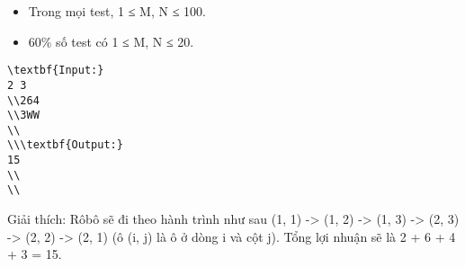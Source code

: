 \begin{itemize}
	\item     Trong mọi test, 1 ≤ M, N ≤ 100.   
	\item     60\% số test có 1 ≤ M, N ≤ 20.   
\end{itemize}
\begin{verbatim}
\textbf{Input:}
2 3
\\264
\\3WW
\\
\\\textbf{Output:}
15
\\
\\\end{verbatim}

Giải thích: Rôbô sẽ đi theo hành trình như sau (1, 1) -> (1, 2) -> (1, 3) -> (2, 3) -> (2, 2) -> (2, 1) (ô (i, j) là ô ở dòng i và cột j). Tổng lợi nhuận sẽ là 2 + 6 + 4 + 3 = 15.